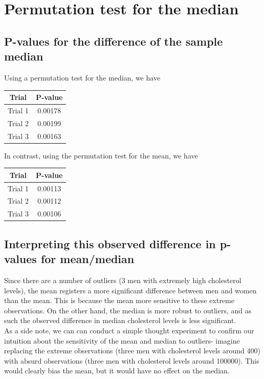 \documentclass[paper=a4, fontsize=11pt]{scrartcl} %
\numberwithin{equation}{section} %
\numberwithin{figure}{section} %
\numberwithin{table}{section} %
\begin{document}

\section{Permutation test for the median}

\subsection{P-values for the difference of the sample median}

Using a permutation test for the median, we have
\begin{center}
   \begin{tabular} { | c | c |} \hline 
      \textbf{Trial} & \textbf{P-value} \\ \hline
      Trial 1 & 0.00178 \\ \hline
      Trial 2 & 0.00199 \\ \hline
      Trial 3 & 0.00163 \\ \hline
   \end{tabular}
\end{center}

In contrast, using the permutation test for the mean, we have 
\begin{center}
   \begin{tabular} { | c | c |} \hline 
      \textbf{Trial} & \textbf{P-value} \\ \hline
      Trial 1 & 0.00113 \\ \hline
      Trial 2 & 0.00112 \\ \hline
      Trial 3 & 0.00106 \\ \hline
   \end{tabular}
\end{center}

\subsection{Interpreting this observed difference in p-values for mean/median}

Since there are a number of outliers (3 men with extremely high cholesterol levels), the mean registers a more significant difference between men and women than the mean. This is because the mean more sensitive to these extreme observations. On the other hand, the median is more robust to outliers, and as such the observed difference in median cholesterol levels is less significant. \\
As a side note, we can can conduct a simple thought experiment to confirm our intuition about the sensitivity of the mean and median to outliers- imagine replacing the extreme observations (three men with cholesterol levels around 400) with absurd observations (three men with cholesterol levels around 100000). This would clearly bias the mean, but it would have no effect on the median.
\end{document}
